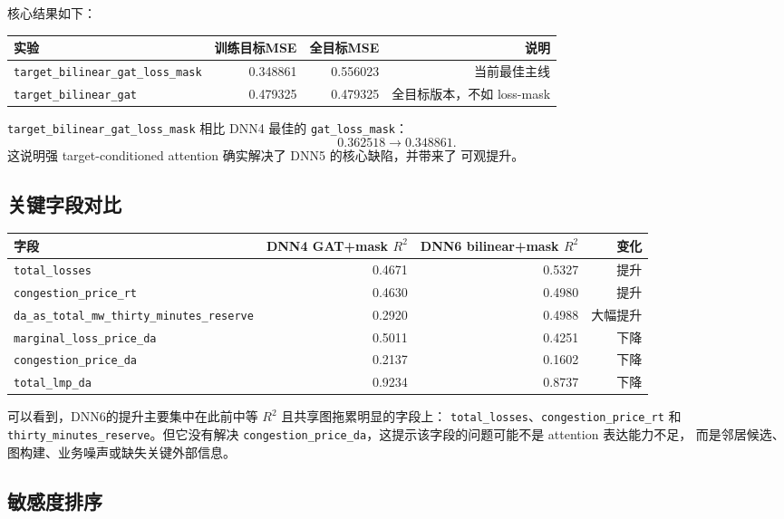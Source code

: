 \documentclass[UTF8,a4paper,11pt]{ctexart}
\begin{document}
核心结果如下：
\begin{center}
\begin{tabular}{lrrr}
\toprule
实验 & 训练目标MSE & 全目标MSE & 说明 \\
\midrule
\texttt{target\_bilinear\_gat\_loss\_mask} & 0.348861 & 0.556023 & 当前最佳主线 \\
\texttt{target\_bilinear\_gat} & 0.479325 & 0.479325 & 全目标版本，不如 loss-mask \\
\bottomrule
\end{tabular}
\end{center}

\texttt{target\_bilinear\_gat\_loss\_mask} 相比 DNN4 最佳的
\texttt{gat\_loss\_mask}：
\[
  0.362518 \rightarrow 0.348861.
\]
这说明强 target-conditioned attention 确实解决了 DNN5 的核心缺陷，并带来了
可观提升。

\subsection{关键字段对比}

\begin{center}
\begin{tabular}{lrrr}
\toprule
字段 & DNN4 GAT+mask $R^2$ & DNN6 bilinear+mask $R^2$ & 变化 \\
\midrule
\texttt{total\_losses} & 0.4671 & 0.5327 & 提升 \\
\texttt{congestion\_price\_rt} & 0.4630 & 0.4980 & 提升 \\
\texttt{da\_as\_total\_mw\_thirty\_minutes\_reserve} & 0.2920 & 0.4988 & 大幅提升 \\
\texttt{marginal\_loss\_price\_da} & 0.5011 & 0.4251 & 下降 \\
\texttt{congestion\_price\_da} & 0.2137 & 0.1602 & 下降 \\
\texttt{total\_lmp\_da} & 0.9234 & 0.8737 & 下降 \\
\bottomrule
\end{tabular}
\end{center}

可以看到，DNN6的提升主要集中在此前中等 $R^2$ 且共享图拖累明显的字段上：
\texttt{total\_losses}、\texttt{congestion\_price\_rt} 和
\texttt{thirty\_minutes\_reserve}。但它没有解决
\texttt{congestion\_price\_da}，这提示该字段的问题可能不是 attention 表达能力不足，
而是邻居候选、图构建、业务噪声或缺失关键外部信息。

\subsection{敏感度排序}
\end{document}
